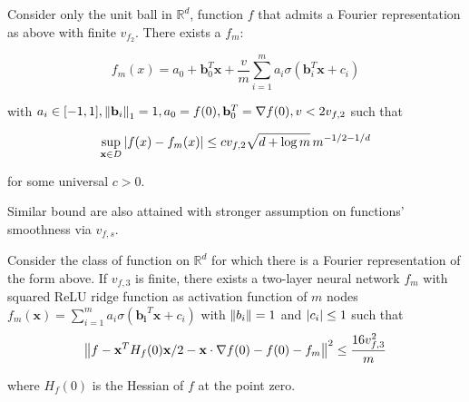 \begin{theorem}
    Consider only the unit ball in $\mathbb{R}^d$, function $f$ that admits a
    Fourier representation as above with finite $v_{f_2}$. There exists a $f_m$:

    \begin{equation}
        f_m(x) = a_0 + \mathbf{b}_0^T \mathbf{x} + \frac{v}{m} \sum_{i=1}^m a_i \sigma(\mathbf{b}_i^T\mathbf{x} + c_i)
    \end{equation}

    with $a_i \in [-1,1], \left\| \mathbf{b}_i \right\|_1 = 1, a_0 = f(0), \mathbf{b}_0^T
        = \nabla f(0), v < 2v_{f,2}$ such that


    \begin{equation}
        \sup_{\mathbf{x} \in D} \left| f(x) - f_m(x) \right| \leq c v_{f,2} \sqrt{d+\log{m}} \, m^{-1/2-1/d}
    \end{equation}

    for some universal $c > 0$.
\end{theorem}

Similar bound are also attained with stronger assumption on functions'
smoothness via $v_{f,s}$.

\begin{theorem}\label{thm:appr_f3} Consider the class of function on
    $\mathbb{R}^d$ for which there is a Fourier representation of the form
    above. If $v_{f, 3}$ is finite, there exists a two-layer neural network
    $f_m$ with squared ReLU ridge function as activation function of $m$ nodes
    $f_m(\mathbf{x}) = \sum_{i=1}^m a_i \sigma(\mathbf{b_i}^T\mathbf{x} + c_i)$
    with $\left\| b_i \right\| = 1$ and $\left| c_i \right|\leq 1$ such that
    \begin{equation}
        \left\| f
            - \mathbf{x}^T H_f(0) \mathbf{x}/2
            - \mathbf{x} \cdot \nabla f(0)
            - f(0)
            - f_m \right\|^2 \leq \frac{16 v_{f, 3}^2}{m}
    \end{equation}

    where $H_f(0)$ is the Hessian of $f$ at the point zero.
\end{theorem}

